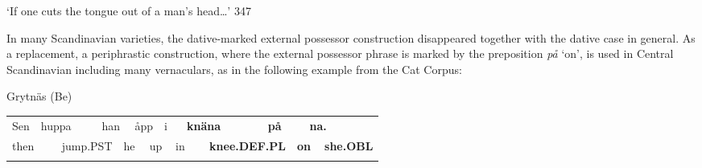 \begin{styleTranslation}
‘If one cuts the tongue out of a man’s head…’ 347

\end{styleTranslation}

\begin{styleBodyTextFirst}
In many Scandinavian varieties, the dative-marked external possessor construction disappeared together with the dative case in general. As a replacement, a periphrastic construction, where the external possessor phrase is marked by the preposition \textit{på} ‘on’, is used in Central Scandinavian including many vernaculars, as in the following example from the Cat Corpus: 

\end{styleBodyTextFirst}

\begin{listWWNumileveli}
\item 

\begin{styleExample}
Grytnäs (Be) 

\end{styleExample}

\end{listWWNumileveli}

\begin{tabular}{llllllllllllllll}
\lsptoprule
Sen & \multicolumn{2}{l}{huppa

} & \multicolumn{2}{l}{han

} & \multicolumn{2}{l}{åpp

} & \multicolumn{2}{l}{i

} & \multicolumn{2}{l}{{\bfseries knäna}

} & \multicolumn{2}{l}{{\bfseries på}

} & \multicolumn{2}{l}{{\bfseries na.}

} & \\
\multicolumn{2}{l}{then

} & \multicolumn{2}{l}{jump.PST

} & \multicolumn{2}{l}{he

} & \multicolumn{2}{l}{up

} & \multicolumn{2}{l}{in

} & \multicolumn{2}{l}{{\bfseries knee.DEF.PL}

} & \multicolumn{2}{l}{{\bfseries on}

} & \multicolumn{2}{l}{{\bfseries she.OBL}

}\\
\lspbottomrule
\end{tabular}

